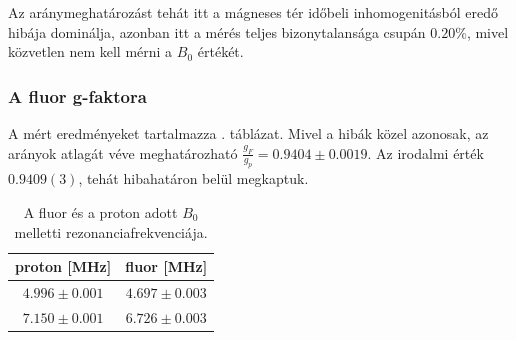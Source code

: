 \documentclass[a4paper,12pt]{article}
\begin{document}
Az aránymeghatározást tehát itt a mágneses tér időbeli inhomogenitásból eredő hibája dominálja, azonban itt a mérés teljes bizonytalansága csupán $0.20\%$, mivel közvetlen nem kell mérni a $B_0$ értékét.

\subsubsection{A fluor g-faktora}
A mért eredményeket tartalmazza . táblázat. Mivel a hibák közel azonosak, az arányok atlagát véve meghatározható $\frac{g_F}{g_p} = 0.9404 \pm 0.0019$. Az irodalmi érték $0.9409(3)$, tehát hibahatáron belül megkaptuk.

\begin{table}[h]
	\begin{center}
	\begin{tabular}{|c|c|}
		\hline
		proton  [MHz] & fluor [MHz]\\ \hline \hline 

		$4.996\pm 0.001$	&$4.697\pm0.003$  \\ \hline 

		$7.150\pm 0.001$	&$6.726\pm0.003$  \\ \hline 

	\end{tabular}
	\end{center}
	\caption{A fluor és a proton adott $B_0$ melletti rezonanciafrekvenciája. }
	\label{tab:fluor}
\end{table}
\end{document}

